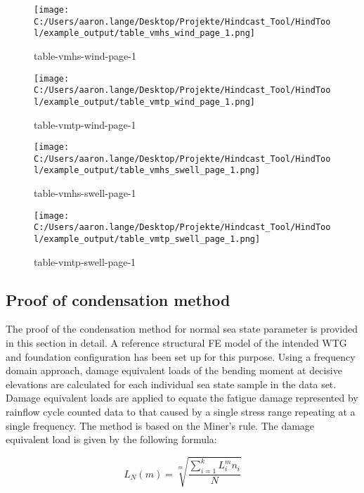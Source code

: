 \begin{figure}[H] 
 \centering 
 \texttt{[image: C:/Users/aaron.lange/Desktop/Projekte/Hindcast\_Tool/HindTool/example\_output/table\_vmhs\_wind\_page\_1.png]} 
 \captionsetup{type=table} 
\caption{ table-vmhs-wind-page-1 } 
 \label{tab: table_vmhs_wind_page_1 } 
\end{figure}
\begin{figure}[H] 
 \centering 
 \texttt{[image: C:/Users/aaron.lange/Desktop/Projekte/Hindcast\_Tool/HindTool/example\_output/table\_vmtp\_wind\_page\_1.png]} 
 \captionsetup{type=table} 
\caption{ table-vmtp-wind-page-1 } 
 \label{tab: table_vmtp_wind_page_1 } 
\end{figure}
\begin{figure}[H] 
 \centering 
 \texttt{[image: C:/Users/aaron.lange/Desktop/Projekte/Hindcast\_Tool/HindTool/example\_output/table\_vmhs\_swell\_page\_1.png]} 
 \captionsetup{type=table} 
\caption{ table-vmhs-swell-page-1 } 
 \label{tab: table_vmhs_swell_page_1 } 
\end{figure}
\begin{figure}[H] 
 \centering 
 \texttt{[image: C:/Users/aaron.lange/Desktop/Projekte/Hindcast\_Tool/HindTool/example\_output/table\_vmtp\_swell\_page\_1.png]} 
 \captionsetup{type=table} 
\caption{ table-vmtp-swell-page-1 } 
 \label{tab: table_vmtp_swell_page_1 } 
\end{figure}

\subsection{Proof of condensation method}
The proof of the condensation method for normal sea state parameter is provided in this section in detail. A reference structural FE model of the intended WTG and foundation configuration has been set up for this purpose. Using a frequency domain approach, damage equivalent loads of the bending moment at decisive elevations are calculated for each individual sea state sample in the data set.
\\
Damage equivalent loads are applied to equate the fatigue damage represented by rainflow cycle counted data to that caused by a single stress range repeating at a single frequency. The method is based on the Miner's rule. The damage equivalent load is given by the following formula:

$$
L_{N}(m)=\sqrt[m]{\frac{\sum_{i=1}^{k} L_{i}^{m} n_{i}}{N}}
$$

